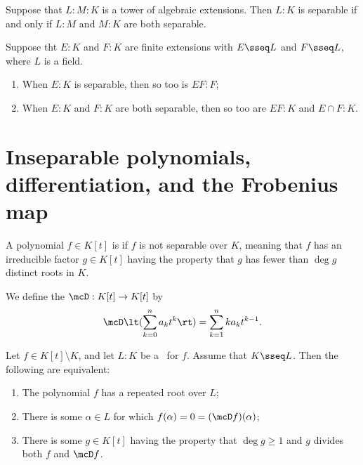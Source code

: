 \documentclass{article}
\begin{document}
  \begin{theorem}
    Suppose that $ L:M:K $ is a tower of algebraic extensions.
    Then $ L:K $ is separable if and only if $ L:M $ and $ M:K $ are both separable.
  \end{theorem}

  \begin{theorem}
    Suppose tht $ E:K $ and $ F:K $ are finite extensions with $ E\sseq L $ and $ F\sseq L $, where $ L $ is a field. \begin{enumerate}[label=(\alph*)]
      \item When $ E:K $ is separable, then so too is $ EF:F $;
      \item When $ E:K $ and $ F:K $ are both separable, then so too are $ EF:K $ and $ E\cap F:K $.
    \end{enumerate}
  \end{theorem}

\section{Inseparable polynomials, differentiation, and the Frobenius map}
  \begin{definition}[Inseparable]
    A polynomial $f \in K[t]$ is  if $f$ is not separable over $K$, meaning that $f$ has an irreducible factor $g \in K[t]$ having the property that $g$ has fewer than $\deg g$ distinct roots in $K$.
  \end{definition}

  \begin{definition}
    We define the  $ \mcD:K[t]\to K[t] $ by \begin{align*}
      \mcD\lt(\sum_{k=0}^{n}a_kt^k\rt) = \sum_{k=1}^{n}ka_kt^{k-1}.
    \end{align*}
  \end{definition}

  \begin{theorem}
    Let $ f\in K[t]\setminus K $, and let $ L:K $ be a \sfe~for $ f $.
    Assume that $ K\sseq L $.
    Then the following are equivalent: \begin{enumerate}[label=(\roman*)]
      \item The polynomial $ f $ has a repeated root over $ L $;
      \item There is some $ \alpha\in L $ for which $ f(\alpha)=0=(\mcD f)(\alpha) $;
      \item There is some $ g\in K[t] $ having the property that $ \deg g \geq 1 $ and $ g $ divides both $ f $ and $ \mcD f $.
    \end{enumerate}
  \end{theorem}
\end{document}
